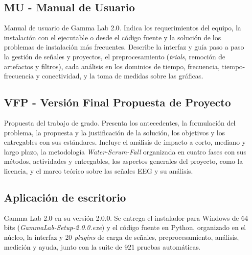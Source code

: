 \documentclass[12pt,letterpaper,oneside]{article}
\begin{document}
\subsection{MU - Manual de Usuario}
\label{anx:mu}
Manual de usuario de Gamma Lab 2.0. Indica los requerimientos del equipo, la instalación con el ejecutable o desde el código fuente y la solución de los problemas de instalación más frecuentes. Describe la interfaz y guía paso a paso la gestión de señales y proyectos, el preprocesamiento (\textit{trials}, remoción de artefactos y filtros), cada análisis en los dominios de tiempo, frecuencia, tiempo-frecuencia y conectividad, y la toma de medidas sobre las gráficas.

\subsection{VFP - Versión Final Propuesta de Proyecto}
\label{anx:vfp}
Propuesta del trabajo de grado. Presenta los antecedentes, la formulación del problema, la propuesta y la justificación de la solución, los objetivos y los entregables con sus estándares. Incluye el análisis de impacto a corto, mediano y largo plazo, la metodología \textit{Water-Scrum-Fall} organizada en cuatro fases con sus métodos, actividades y entregables, los aspectos generales del proyecto, como la licencia, y el marco teórico sobre las señales EEG y su análisis.

\subsection{Aplicación de escritorio}
\label{anx:app}
Gamma Lab 2.0 en su versión 2.0.0. Se entrega el instalador para Windows de 64 bits (\textit{GammaLab-Setup-2.0.0.exe}) y el código fuente en Python, organizado en el núcleo, la interfaz y 20 \textit{plugins} de carga de señales, preprocesamiento, análisis, medición y ayuda, junto con la suite de 921 pruebas automáticas.
\end{document}
